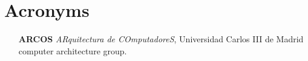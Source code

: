 \lhead[\thepage]{\appendix}
\chead[]{}
\renewcommand{\headrulewidth}{0.5pt}

\lfoot[]{}
\cfoot[]{}
\rfoot[]{}
\renewcommand{\footrulewidth}{0pt}

\chapter{Acronyms}

\vspace*{-3in}

\clearpage
\newpage

\begin{itemize}

\item[\textbf{ARCOS}] \textit{ARquitectura de COmputadoreS}, Universidad Carlos III de Madrid computer architecture group.

\end{itemize}
